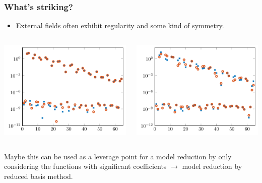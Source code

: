 \begin{frame}[t]
    \frametitle{What's striking?}

    \begin{itemize}
        \item External fields often exhibit regularity and some kind of symmetry.
    \end{itemize}

    \vfill

    \begin{columns}
        \begin{column}{0.5\textwidth}
            \includegraphics[width=\textwidth]{figures/scft2.pdf}
        \end{column}
        \begin{column}{0.5\textwidth}
            \includegraphics[width=\textwidth]{figures/scft_example2_fourier_coeffs.pdf}
        \end{column}
    \end{columns}

    Maybe this can be used as a leverage point for a model reduction by only considering the functions with significant coefficients
    $\rightarrow$ model reduction by reduced basis method.
\end{frame}

